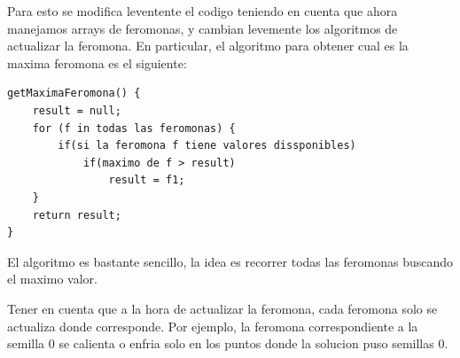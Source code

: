Para esto se modifica leventente el codigo teniendo en cuenta que ahora manejamos arrays de feromonas, y cambian levemente los algoritmos de actualizar la feromona. En particular, el algoritmo para obtener cual es la maxima feromona es el siguiente:


\begin{verbatim}
getMaximaFeromona() {
    result = null;
    for (f in todas las feromonas) {
        if(si la feromona f tiene valores dissponibles)
            if(maximo de f > result)
                result = f1;
    }
    return result;
}
\end{verbatim}

El algoritmo es bastante sencillo, la idea es recorrer todas las feromonas buscando el maximo valor. 

Tener en cuenta que a la hora de actualizar la feromona, cada feromona solo se actualiza donde corresponde. Por ejemplo,  la feromona correspondiente a la semilla 0 se calienta o enfria solo en los puntos donde la solucion puso semillas 0. 